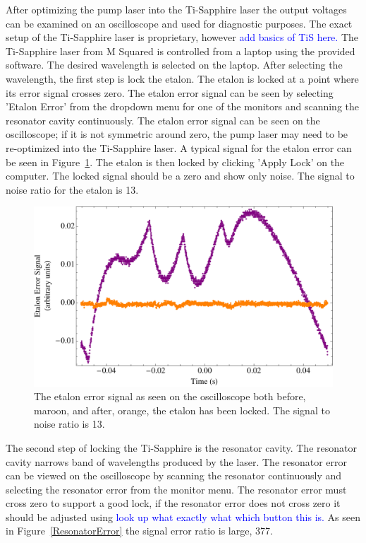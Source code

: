 \documentclass[prb,preprint]{revtex4-1}
\begin{document}
After optimizing the pump laser into the Ti-Sapphire laser the output voltages can be examined on an oscilloscope and used for diagnostic purposes. The exact setup of the Ti-Sapphire laser is proprietary, however \textcolor{blue}{add basics of TiS here.} The Ti-Sapphire laser from M Squared is controlled from a laptop using the provided software. The desired wavelength is selected on the laptop. After selecting the wavelength, the first step is lock the etalon. The etalon is locked at a point where its error signal crosses zero. The etalon error signal can be seen by selecting 'Etalon Error' from the dropdown menu for one of the monitors and scanning the resonator cavity continuously. The etalon error signal can be seen on the oscilloscope; if it is not symmetric around zero, the pump laser may need to be re-optimized into the Ti-Sapphire laser. A typical signal for the etalon error can be seen in Figure~\ref{EtalonError}. The etalon is then locked by clicking 'Apply Lock' on the computer. The locked signal should be a zero and show only noise. The signal to noise ratio for the etalon is 13.

\begin{figure}[h!]
\centering
\includegraphics[width=6in]{EtalonError.pdf}
\caption{The etalon error signal as seen on the oscilloscope both before, maroon, and after, orange, the etalon has been locked. The signal to noise ratio is 13.}
\label{EtalonError}
\end{figure}

The second step of locking the Ti-Sapphire is the resonator cavity. The resonator cavity narrows  band of wavelengths produced by the laser. The resonator error can be viewed on the oscilloscope by scanning the resonator continuously and selecting the resonator error from the monitor menu. The resonator error must cross zero to support a good lock, if the resonator error does not cross zero it should be adjusted using \textcolor{blue}{look up what exactly what which button this is.} As seen in Figure~\ref{ResonatorError} the signal error ratio is large, 377.
\end{document}
